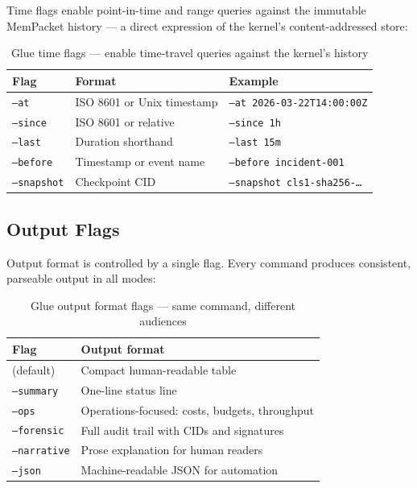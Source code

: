 Time flags enable point-in-time and range queries against the immutable
MemPacket history — a direct expression of the kernel's content-addressed store:

\begin{table}[H]
\centering
\renewcommand{\arraystretch}{1.35}
\begin{tabular}{@{}lll@{}}
\toprule
\textbf{Flag} & \textbf{Format} & \textbf{Example} \\
\midrule
\texttt{--at}      & ISO 8601 or Unix timestamp & \texttt{--at 2026-03-22T14:00:00Z} \\
\texttt{--since}   & ISO 8601 or relative       & \texttt{--since 1h} \\
\texttt{--last}    & Duration shorthand         & \texttt{--last 15m} \\
\texttt{--before}  & Timestamp or event name    & \texttt{--before incident-001} \\
\texttt{--snapshot}& Checkpoint CID             & \texttt{--snapshot cls1-sha256-…} \\
\bottomrule
\end{tabular}
\caption{Glue time flags — enable time-travel queries against the kernel's history}
\end{table}

\subsection{Output Flags}

Output format is controlled by a single flag. Every command produces consistent,
parseable output in all modes:

\begin{table}[H]
\centering
\renewcommand{\arraystretch}{1.35}
\begin{tabular}{@{}lp{10cm}@{}}
\toprule
\textbf{Flag} & \textbf{Output format} \\
\midrule
(default)      & Compact human-readable table \\
\texttt{--summary}   & One-line status line \\
\texttt{--ops}       & Operations-focused: costs, budgets, throughput \\
\texttt{--forensic}  & Full audit trail with CIDs and signatures \\
\texttt{--narrative} & Prose explanation for human readers \\
\texttt{--json}      & Machine-readable JSON for automation \\
\bottomrule
\end{tabular}
\caption{Glue output format flags — same command, different audiences}
\end{table}

